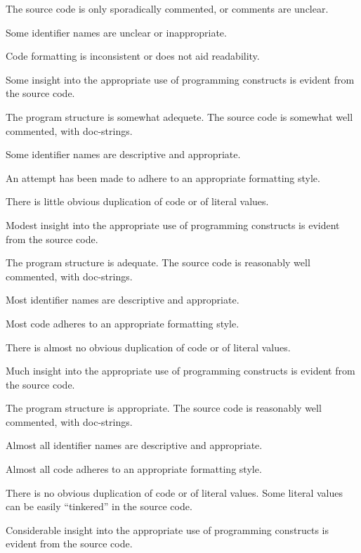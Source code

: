 \documentclass{../../fal_assignment}
\begin{document}
\begin{markingrubric}
        \grade The source code is only sporadically commented, or comments are unclear.
            \par Some identifier names are unclear or inappropriate.
            \par Code formatting is inconsistent or does not aid readability.
            \par Some insight into the appropriate use of programming constructs is evident from the source code.
            \par The program structure is somewhat adequete.
        \grade The source code is somewhat well commented, with doc-strings.
            \par Some identifier names are descriptive and appropriate.
            \par An attempt has been made to adhere to an appropriate formatting style.
             \par There is little obvious duplication of code or of literal values.   
             \par Modest insight into the appropriate use of programming constructs is evident from the source code.
             \par The program structure is adequate.    
        \grade The source code is reasonably well commented, with doc-strings.
            \par Most identifier names are descriptive and appropriate.
            \par Most code adheres to an appropriate formatting style.
             \par There is almost no obvious duplication of code or of literal values.   
             \par Much insight into the appropriate use of programming constructs is evident from the source code.
            \par  The program structure is appropriate.
        \grade The source code is reasonably well commented, with doc-strings.
            \par Almost all identifier names are descriptive and appropriate.
            \par Almost all code adheres to an appropriate formatting style.
             \par There is no obvious duplication of code or of literal values. Some literal values can be easily ``tinkered'' in the source code. 
             \par Considerable insight into the appropriate use of programming constructs is evident from the source code.

\end{markingrubric}
\end{document}
